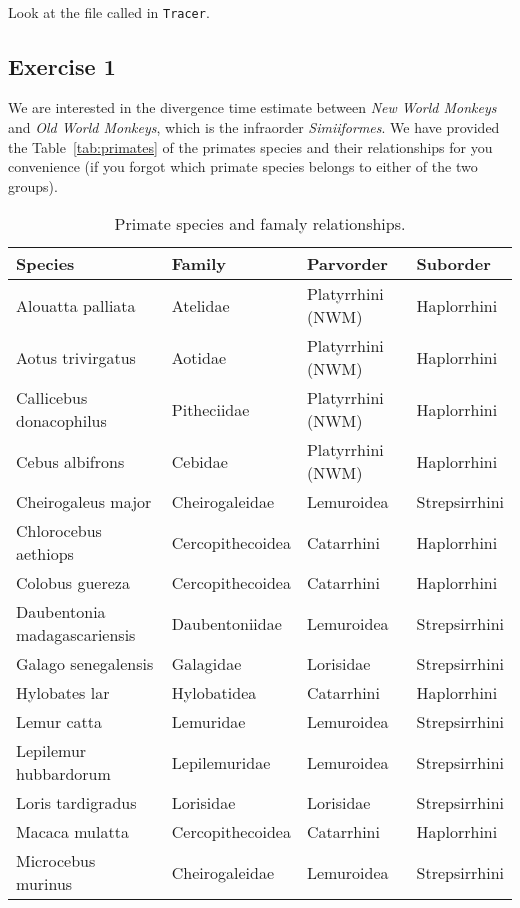 \noindent \\ \impmark Look at the file called  in \texttt{Tracer}.


\subsection{Exercise 1}

We are interested in the divergence time estimate between \emph{New World Monkeys} and \emph{Old World Monkeys}, which is the infraorder \emph{Simiiformes}.
We have provided the Table~\ref{tab:primates} of the primates species and their relationships for you convenience (if you forgot which primate species belongs to either of the two groups).
\begin{table}[h!]
\centering
\caption{\small Primate species and famaly relationships.}
\begin{tabular}{l l l l}
\hline
\textbf{Species} & \textbf{Family} & \textbf{Parvorder} & \textbf{Suborder} \\ 
\hline
Alouatta palliata & Atelidae & Platyrrhini (NWM) & Haplorrhini \\
Aotus trivirgatus & Aotidae & Platyrrhini (NWM) & Haplorrhini \\
Callicebus donacophilus & Pitheciidae & Platyrrhini (NWM) & Haplorrhini \\
Cebus albifrons & Cebidae & Platyrrhini (NWM) & Haplorrhini \\
Cheirogaleus major & Cheirogaleidae & Lemuroidea & Strepsirrhini \\
Chlorocebus aethiops & Cercopithecoidea & Catarrhini & Haplorrhini \\
Colobus guereza & Cercopithecoidea & Catarrhini & Haplorrhini \\
Daubentonia madagascariensis & Daubentoniidae & Lemuroidea & Strepsirrhini \\
Galago senegalensis & Galagidae & Lorisidae & Strepsirrhini \\
Hylobates lar & Hylobatidea & Catarrhini & Haplorrhini \\
Lemur catta & Lemuridae & Lemuroidea & Strepsirrhini \\
Lepilemur hubbardorum & Lepilemuridae & Lemuroidea & Strepsirrhini \\
Loris tardigradus & Lorisidae & Lorisidae & Strepsirrhini \\
Macaca mulatta & Cercopithecoidea & Catarrhini & Haplorrhini \\
Microcebus murinus & Cheirogaleidae & Lemuroidea & Strepsirrhini \\

\end{tabular}
\end{table}
